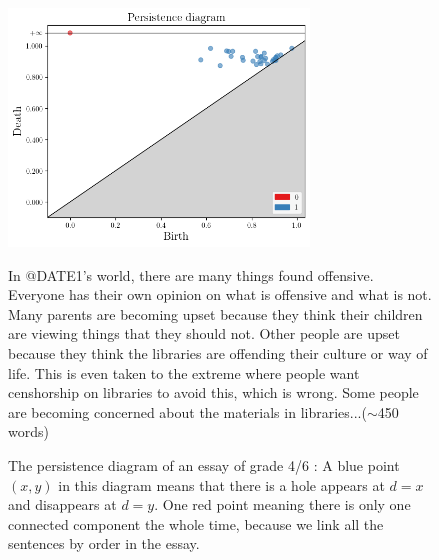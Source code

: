 \begin{figure}[H]
\begin{minipage}{0.49\linewidth}
\includegraphics[width=8cm]{pdessay.png}
\end{minipage}
\begin{minipage}{0.49\linewidth}
In @DATE1's world, there are many things found offensive.  Everyone has their own opinion on what is offensive and what is not. Many parents are becoming upset because they think their children are viewing things that they should not.  Other people are upset because they think the libraries are offending their culture or way of life.  This is even taken to the extreme where people want censhorship on libraries to avoid this, which is wrong.     Some people are becoming concerned about the materials in libraries...($\sim$450 words)
\end{minipage}
\caption{The persistence diagram of an essay of grade 4/6 : A blue point $(x, y)$ in this diagram means
that there is a hole appears at $d=x$ and disappears at $d=y$.
One red point meaning there is only one connected component the whole time,
because we link all the sentences by order in the essay.
}
\label{fig:pd}
\end{figure}

